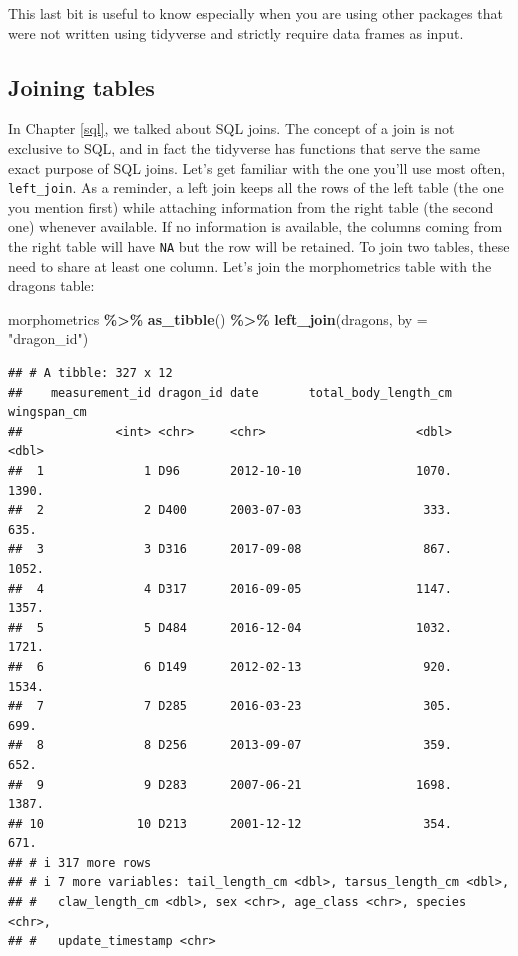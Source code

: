 \documentclass[
]{book}
\newenvironment{Shaded}{\begin{snugshade}}{\end{snugshade}}
\newcommand{\AttributeTok}[1]{\textcolor[rgb]{0.13,0.29,0.53}{#1}}
\newcommand{\FunctionTok}[1]{\textcolor[rgb]{0.13,0.29,0.53}{\textbf{#1}}}
\newcommand{\NormalTok}[1]{#1}
\newcommand{\SpecialCharTok}[1]{\textcolor[rgb]{0.81,0.36,0.00}{\textbf{#1}}}
\newcommand{\StringTok}[1]{\textcolor[rgb]{0.31,0.60,0.02}{#1}}
\begin{document}
This last bit is useful to know especially when you are using other packages
that were not written using tidyverse and strictly require data frames as input.

\hypertarget{joining-tables}{%
\subsection{Joining tables}\label{joining-tables}}

In Chapter \ref{sql}, we talked about SQL joins. The concept of a join is not
exclusive to SQL, and in fact the tidyverse has functions that serve the same
exact purpose of SQL joins. Let's get familiar with the one you'll use most
often, \texttt{left\_join}. As a reminder, a left join keeps all the rows of the left
table (the one you mention first) while attaching information from the right
table (the second one) whenever available. If no information is available, the
columns coming from the right table will have \texttt{NA} but the row will be retained.
To join two tables, these need to share at least one column. Let's join the
morphometrics table with the dragons table:

\begin{Shaded}
\begin{Highlighting}[]
\NormalTok{morphometrics }\SpecialCharTok{\%\textgreater{}\%} 
  \FunctionTok{as\_tibble}\NormalTok{() }\SpecialCharTok{\%\textgreater{}\%} 
  \FunctionTok{left\_join}\NormalTok{(dragons, }\AttributeTok{by =} \StringTok{"dragon\_id"}\NormalTok{) }
\end{Highlighting}
\end{Shaded}

\begin{verbatim}
## # A tibble: 327 x 12
##    measurement_id dragon_id date       total_body_length_cm wingspan_cm
##             <int> <chr>     <chr>                     <dbl>       <dbl>
##  1              1 D96       2012-10-10                1070.       1390.
##  2              2 D400      2003-07-03                 333.        635.
##  3              3 D316      2017-09-08                 867.       1052.
##  4              4 D317      2016-09-05                1147.       1357.
##  5              5 D484      2016-12-04                1032.       1721.
##  6              6 D149      2012-02-13                 920.       1534.
##  7              7 D285      2016-03-23                 305.        699.
##  8              8 D256      2013-09-07                 359.        652.
##  9              9 D283      2007-06-21                1698.       1387.
## 10             10 D213      2001-12-12                 354.        671.
## # i 317 more rows
## # i 7 more variables: tail_length_cm <dbl>, tarsus_length_cm <dbl>,
## #   claw_length_cm <dbl>, sex <chr>, age_class <chr>, species <chr>,
## #   update_timestamp <chr>
\end{verbatim}
\end{document}
